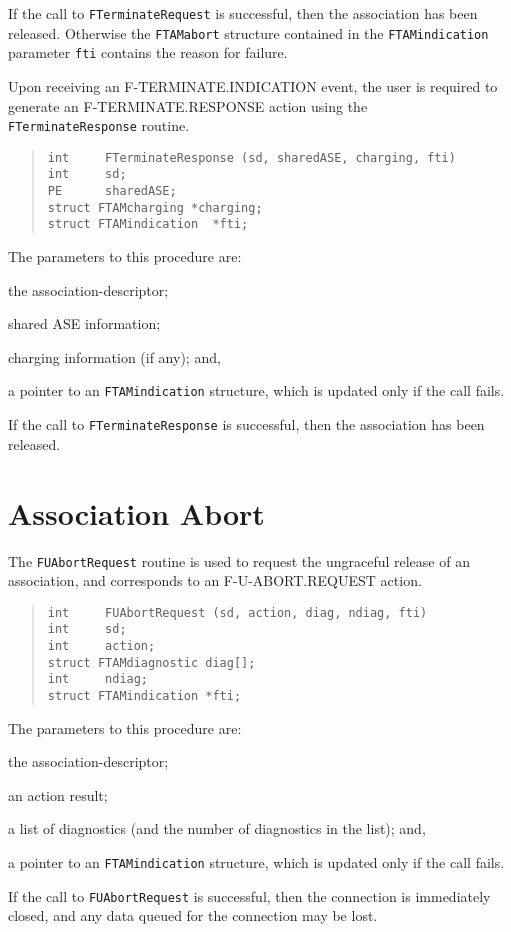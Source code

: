 If the call to \verb"FTerminateRequest" is successful,
then the association has been released.
Otherwise the \verb"FTAMabort" structure contained in
the \verb"FTAMindication" parameter
\verb"fti" contains the reason for failure.

Upon receiving an {\sf F-TERMINATE.INDICATION\/} event,
the user is required to generate an {\sf F-TERMINATE.RESPONSE\/} action
using the\\	%
\verb"FTerminateResponse" routine.
\begin{quote}\small\begin{verbatim}
int     FTerminateResponse (sd, sharedASE, charging, fti)
int     sd;
PE      sharedASE;
struct FTAMcharging *charging;
struct FTAMindication  *fti;
\end{verbatim}\end{quote}
The parameters to this procedure are:
\begin{describe}
\item[\verb"sd":] the association-descriptor;

\item[\verb"sharedASE":] shared ASE information;

\item[\verb"charging":] charging information (if any);
and,

\item[\verb"fti":] a pointer to an \verb"FTAMindication" structure, which is
updated only if the call fails.
\end{describe}
If the call to \verb"FTerminateResponse" is successful,
then the association has been released.

\section	{Association Abort}
The \verb"FUAbortRequest" routine is used to request the ungraceful release
of an association,
and corresponds to an {\sf F-U-ABORT.REQUEST\/} action.
\begin{quote}\small\begin{verbatim}
int     FUAbortRequest (sd, action, diag, ndiag, fti)
int     sd;
int     action;
struct FTAMdiagnostic diag[];
int     ndiag;
struct FTAMindication *fti;
\end{verbatim}\end{quote}
The parameters to this procedure are:
\begin{describe}
\item[\verb"sd":] the association-descriptor;

\item[\verb"action":] an action result;

\item[\verb"diag"/\verb"ndiag":] a list of diagnostics
(and the number of diagnostics in the list);
and,

\item[\verb"fti":] a pointer to an \verb"FTAMindication" structure, which is
updated only if the call fails.
\end{describe}
If the call to \verb"FUAbortRequest" is successful,
then the connection is immediately closed,
and any data queued for the connection may be lost.

